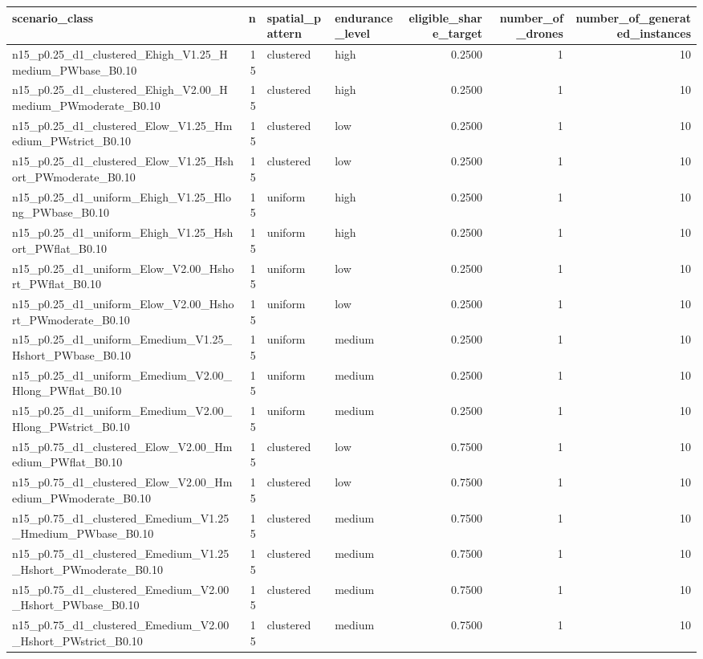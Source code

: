 \begin{tabular}{lrllrrr}
\toprule
scenario_class & n & spatial_pattern & endurance_level & eligible_share_target & number_of_drones & number_of_generated_instances \\
\midrule
n15_p0.25_d1_clustered_Ehigh_V1.25_Hmedium_PWbase_B0.10 & 15 & clustered & high & 0.2500 & 1 & 10 \\
n15_p0.25_d1_clustered_Ehigh_V2.00_Hmedium_PWmoderate_B0.10 & 15 & clustered & high & 0.2500 & 1 & 10 \\
n15_p0.25_d1_clustered_Elow_V1.25_Hmedium_PWstrict_B0.10 & 15 & clustered & low & 0.2500 & 1 & 10 \\
n15_p0.25_d1_clustered_Elow_V1.25_Hshort_PWmoderate_B0.10 & 15 & clustered & low & 0.2500 & 1 & 10 \\
n15_p0.25_d1_uniform_Ehigh_V1.25_Hlong_PWbase_B0.10 & 15 & uniform & high & 0.2500 & 1 & 10 \\
n15_p0.25_d1_uniform_Ehigh_V1.25_Hshort_PWflat_B0.10 & 15 & uniform & high & 0.2500 & 1 & 10 \\
n15_p0.25_d1_uniform_Elow_V2.00_Hshort_PWflat_B0.10 & 15 & uniform & low & 0.2500 & 1 & 10 \\
n15_p0.25_d1_uniform_Elow_V2.00_Hshort_PWmoderate_B0.10 & 15 & uniform & low & 0.2500 & 1 & 10 \\
n15_p0.25_d1_uniform_Emedium_V1.25_Hshort_PWbase_B0.10 & 15 & uniform & medium & 0.2500 & 1 & 10 \\
n15_p0.25_d1_uniform_Emedium_V2.00_Hlong_PWflat_B0.10 & 15 & uniform & medium & 0.2500 & 1 & 10 \\
n15_p0.25_d1_uniform_Emedium_V2.00_Hlong_PWstrict_B0.10 & 15 & uniform & medium & 0.2500 & 1 & 10 \\
n15_p0.75_d1_clustered_Elow_V2.00_Hmedium_PWflat_B0.10 & 15 & clustered & low & 0.7500 & 1 & 10 \\
n15_p0.75_d1_clustered_Elow_V2.00_Hmedium_PWmoderate_B0.10 & 15 & clustered & low & 0.7500 & 1 & 10 \\
n15_p0.75_d1_clustered_Emedium_V1.25_Hmedium_PWbase_B0.10 & 15 & clustered & medium & 0.7500 & 1 & 10 \\
n15_p0.75_d1_clustered_Emedium_V1.25_Hshort_PWmoderate_B0.10 & 15 & clustered & medium & 0.7500 & 1 & 10 \\
n15_p0.75_d1_clustered_Emedium_V2.00_Hshort_PWbase_B0.10 & 15 & clustered & medium & 0.7500 & 1 & 10 \\
n15_p0.75_d1_clustered_Emedium_V2.00_Hshort_PWstrict_B0.10 & 15 & clustered & medium & 0.7500 & 1 & 10 \\

\end{tabular}
